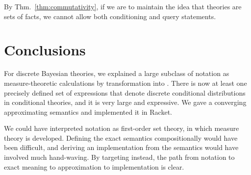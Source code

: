 By Thm.~\ref{thm:commutativity}, if we are to maintain the idea that theories are sets of facts, we cannot allow both conditioning and query statements.

\section{Conclusions}
\label{sec:conclusion}

For discrete Bayesian theories, we explained a large subclass of notation as measure-theoretic calculations by transformation into \targetlang. There is now at least one precisely defined set of expressions that denote discrete conditional distributions in conditional theories, and it is very large and expressive. We gave a converging approximating semantics and implemented it in Racket.

We could have interpreted notation as first-order set theory, in which measure theory is developed. Defining the exact semantics compositionally would have been difficult, and deriving an implementation from the semantics would have involved much hand-waving. By targeting \lzfclang instead, the path from notation to exact meaning to approximation to implementation is clear.
